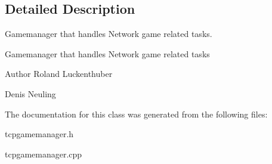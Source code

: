 \subsection{\-Detailed \-Description}
\-Gamemanager that handles \-Network game related tasks. 

\-Gamemanager that handles \-Network game related tasks

\begin{DoxyAuthor}{\-Author}
\-Roland \-Luckenthuber 

\-Denis \-Neuling 
\end{DoxyAuthor}


\-The documentation for this class was generated from the following files\-:\begin{DoxyCompactItemize}
\item 
tcpgamemanager.\-h\item 
tcpgamemanager.\-cpp\end{DoxyCompactItemize}
